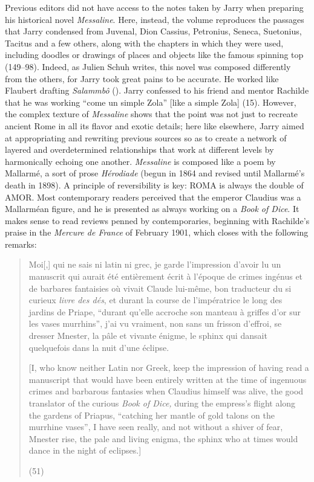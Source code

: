 \documentclass{article}
\begin{document}
Previous editors did not have access to the notes taken by Jarry when
preparing his historical novel \emph{Messaline}. Here, instead, the
volume reproduces the passages that Jarry condensed from Juvenal, Dion
Cassius, Petronius, Seneca, Suetonius, Tacitus and a few others, along
with the chapters in which they were used, including doodles or drawings
of places and objects like the famous spinning top (149--98). Indeed, as
Julien Schuh writes, this novel was composed differently from the
others, for Jarry took great pains to be accurate. He worked like
Flaubert drafting \emph{Salammbô} (\citeyear{flaubert_salammbo_1862}). Jarry confessed to his friend and
mentor Rachilde that he was working ``come un simple Zola'' [like a simple Zola] (15). However, the complex texture of \emph{Messaline}
shows that the point was not just to recreate ancient Rome in all its
flavor and exotic details; here like elsewhere, Jarry aimed at
appropriating and rewriting previous sources so as to create a network
of layered and overdetermined relationships that work at different
levels by harmonically echoing one another. \emph{Messaline} is composed
like a poem by Mallarmé, a sort of prose \emph{Hérodiade} (begun in 1864 and revised until Mallarmé's death in 1898). A principle
of reversibility is key: ROMA is always the double of AMOR. Most
contemporary readers perceived that the emperor Claudius was a
Mallarméan figure, and he is presented as always working on a \emph{Book
of Dice}. It makes sense to read reviews penned by contemporaries,
beginning with Rachilde's praise in the \emph{Mercure de France} of February 1901, which closes with the following remarks:

\begin{quote}
Moi[,] qui ne sais ni latin ni grec, je garde l’impression d’avoir lu un manuscrit qui aurait été entièrement écrit à l’époque de crimes ingénus et de barbares fantaisies où vivait Claude lui-même, bon traducteur du si curieux \emph{livre des dés}, et durant la course de l’impératrice le long des jardins de Priape, ``durant qu’elle accroche son manteau à griffes d’or sur les vases murrhins'', j’ai vu vraiment, non sans un frisson d’effroi, se dresser Mnester, la pâle et vivante énigme, le sphinx qui dansait quelquefois dans la nuit d’une éclipse.

\vspace{1em}

[I, who know neither Latin nor Greek, keep the impression of having read a
manuscript that would have been entirely written at the time of
ingenuous crimes and barbarous fantasies when Claudius himself was
alive, the good translator of the curious \emph{Book of Dice,} during
the empress's flight along the gardens of Priapus, ``catching her mantle
of gold talons on the murrhine vases'', I have seen really, and not
without a shiver of fear, Mnester rise, the pale and living enigma, the
sphinx who at times would dance in the night of eclipses.]

\begin{flushright}
(51)
\end{flushright}
\end{quote}
\end{document}
